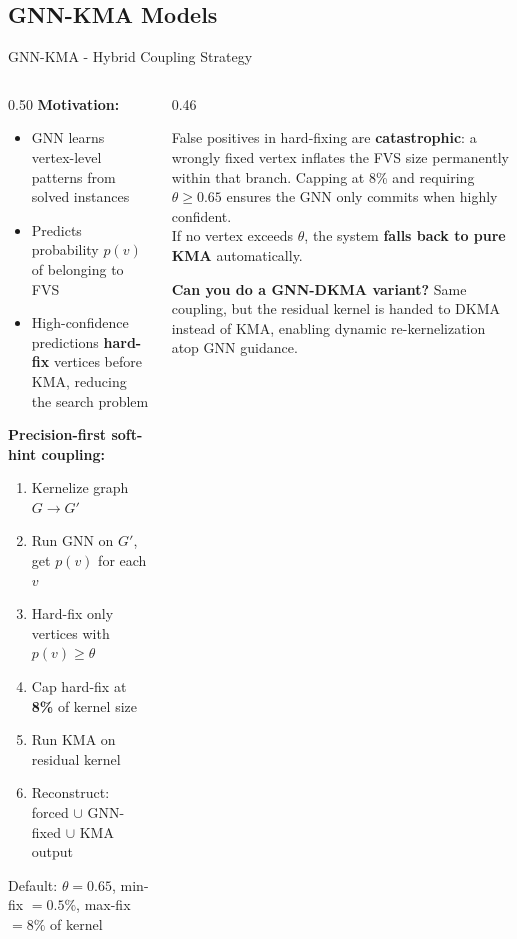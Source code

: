 \documentclass[aspectratio=169]{beamer}
\renewcommand{\footnotesize}{\tiny}
\begin{document}
\subsection{GNN-KMA Models}

\begin{frame}{GNN-KMA - Hybrid Coupling Strategy}
	\tiny
	\begin{columns}[T]
		\begin{column}{0.50\textwidth}
			\textbf{Motivation:}
			\begin{itemize}
				\item GNN learns vertex-level patterns from solved instances
				\item Predicts probability $p(v)$ of belonging to FVS
				\item High-confidence predictions \textbf{hard-fix} vertices
				      before KMA, reducing the search problem
			\end{itemize}
			\vspace{6pt}
			\textbf{Precision-first soft-hint coupling:}
			\begin{enumerate}\setlength\itemsep{2pt}
				\item Kernelize graph $G \to G'$
				\item Run GNN on $G'$, get $p(v)$ for each $v$
				\item Hard-fix only vertices with $p(v) \ge \theta$
				\item Cap hard-fix at \textbf{8\%} of kernel size
				\item Run KMA on residual kernel
				\item Reconstruct: forced $\cup$ GNN-fixed $\cup$ KMA output
			\end{enumerate}
			\vspace{3pt}
			{\footnotesize Default: $\theta=0.65$,
				min-fix $= 0.5\%$, max-fix $= 8\%$ of kernel}
		\end{column}
		\begin{column}{0.46\textwidth}
			\begin{tcolorbox}[mybox,title=Why Precision-First?]
				\footnotesize
				False positives in hard-fixing are \textbf{catastrophic}:
				a wrongly fixed vertex inflates the FVS size permanently
				within that branch. Capping at 8\% and requiring $\theta \ge 0.65$
				ensures the GNN only commits when highly confident.
				\\[4pt]
				If no vertex exceeds $\theta$, the system
				\textbf{falls back to pure KMA} automatically.
			\end{tcolorbox}
			\vspace{5pt}
			\begin{tcolorbox}[greenbox,fontupper=\footnotesize]
				\textbf{Can you do a GNN-DKMA variant?} Same coupling, but
				the residual kernel is handed to DKMA instead of KMA,
				enabling dynamic re-kernelization atop GNN guidance.
			\end{tcolorbox}
		\end{column}
	\end{columns}
\end{frame}
\end{document}
